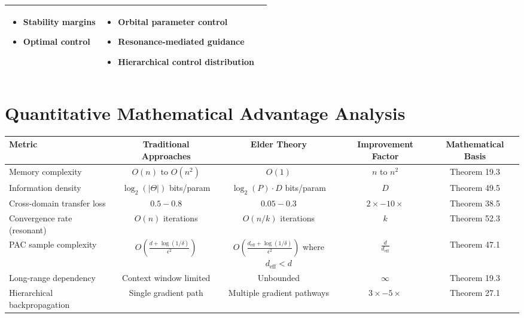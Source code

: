 \begin{center}
\begin{tabular}{|p{3cm}|p{5cm}|p{5cm}|}
\begin{itemize}
    \item Stability margins
    \item Optimal control
\end{itemize} &
\begin{itemize}
    \item Orbital parameter control
    \item Resonance-mediated guidance
    \item Hierarchical control distribution
\end{itemize} \\
\hline
\end{tabular}
\label{tab:dynamical_comparison}
\end{center}

\section{Quantitative Mathematical Advantage Analysis}

\begin{center}
\begin{tabular}{|p{3.5cm}|c|c|c|c|}
\hline
\textbf{Metric} & \textbf{Traditional Approaches} & \textbf{Elder Theory} & \textbf{Improvement Factor} & \textbf{Mathematical Basis} \\
\hline
Memory complexity & $O(n)$ to $O(n^2)$ & $O(1)$ & $n$ to $n^2$ & Theorem 19.3 \\
\hline
Information density & $\log_2(|\Theta|)$ bits/param & $\log_2(P) \cdot D$ bits/param & $D$ & Theorem 49.5 \\
\hline
Cross-domain transfer loss & $0.5 - 0.8$ & $0.05 - 0.3$ & $2\times - 10\times$ & Theorem 38.5 \\
\hline
Convergence rate (resonant) & $O(n)$ iterations & $O(n/k)$ iterations & $k$ & Theorem 52.3 \\
\hline
PAC sample complexity & $O\left(\frac{d + \log(1/\delta)}{\epsilon^2}\right)$ & $O\left(\frac{d_{\text{eff}} + \log(1/\delta)}{\epsilon^2}\right)$ where $d_{\text{eff}} < d$ & $\frac{d}{d_{\text{eff}}}$ & Theorem 47.1 \\
\hline
Long-range dependency & Context window limited & Unbounded & $\infty$ & Theorem 19.3 \\
\hline
Hierarchical backpropagation & Single gradient path & Multiple gradient pathways & $3\times - 5\times$ & Theorem 27.1 \\
\hline
\end{tabular}
\label{tab:quantitative_comparison}
\end{center}

